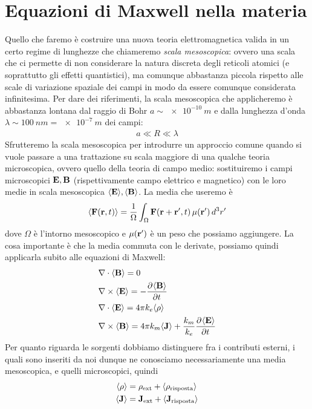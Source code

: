 \section{Equazioni di Maxwell nella materia}
Quello che faremo è costruire una nuova teoria elettromagnetica valida in un certo regime di lunghezze che chiameremo \textit{scala mesoscopica}: ovvero una 
scala che ci permette di non considerare la natura discreta degli reticoli atomici (e soprattutto gli effetti quantistici), ma comunque abbastanza piccola 
rispetto alle scale di variazione spaziale dei campi in modo da essere comunque considerata infinitesima. Per dare dei riferimenti, la scala mesoscopica 
che applicheremo è abbastanza lontana dal raggio di Bohr $ a \sim \SI{e-10}{m} $ e dalla lunghezza d'onda $ \lambda \sim \SI{100}{nm} = \SI{e-7}{m}$ 
dei campi:
\begin{align}
  a \ll R \ll \lambda \tag*{[scala mesoscopica]}
\end{align}
Sfrutteremo la scala mesoscopica per introdurre un approccio comune quando si vuole passare a una trattazione su scala maggiore di una qualche teoria 
microscopica, ovvero quello della teoria di campo medio: sostituiremo i campi microscopici $ \mathbf{E}, \mathbf{B} $ (rispettivamente campo elettrico e magnetico) 
con le loro medie in scala mesoscopica $ \langle \mathbf{E} \rangle, \langle \mathbf{B} \rangle $. La media che useremo è 
\begin{align}
  \langle \mathbf{F}(\mathbf{r},t) \rangle = \frac{1}{\Omega} \int_\Omega \mathbf{F}(\mathbf{r + r'}, t) \, \mu(\mathbf{r'})\,d^3r'
\end{align}
dove $ \Omega $ è l'intorno mesoscopico e $ \mu(\mathbf{r'}) $ è un peso che possiamo aggiungere. La cosa importante è che la media commuta con le derivate, 
possiamo quindi applicarla subito alle equazioni di Maxwell:
\begin{align}
  &\nabla \cdot \langle \mathbf{B} \rangle = 0
  \\
  &\nabla \times \langle \mathbf{E} \rangle = - \frac{\partial^{} {\langle \mathbf{B} \rangle}}{\partial {t}^{}}
  \\
  &\nabla \cdot \langle \mathbf{E} \rangle = 4\pi k_e {\langle \rho \rangle}
  \\
  &\nabla \times \langle \mathbf{B} \rangle = 4\pi k_m \langle \mathbf{J} \rangle + \frac{k_m}{k_e} \frac{\partial^{} {\langle \mathbf{E} \rangle}}{\partial {t}^{}}
\end{align}
Per quanto riguarda le sorgenti dobbiamo distinguere fra i contributi esterni, i quali sono inseriti da noi dunque ne conosciamo necessariamente una media 
mesoscopica, e quelli microscopici, quindi
\begin{align}
  \langle \rho \rangle &= \rho_{\text{ext}} + \langle \rho_{\text{risposta}} \rangle
  \\
  \langle \mathbf{J} \rangle &= \mathbf{J}_{\text{ext}} + \langle \mathbf{J}_{\text{risposta}} \rangle
\end{align}

